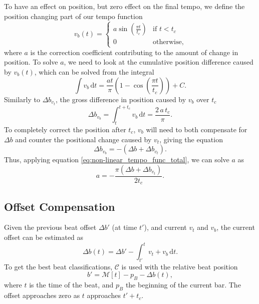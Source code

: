 To have an effect on position,
but zero effect on the final tempo,
we define the position changing part of our tempo function
\begin{equation}
v_b(t) =
\begin{cases}
a \sin \left( \frac{\pi t}{t_c} \right) & \text{if } t < t_c \\
0 & \text{otherwise},
\end{cases}
\end{equation}
where $a$ is the correction coefficient
contributing to the amount of change in position.
To solve $a$, we need to look at the
cumulative position difference caused by $v_b(t)$,
which can be solved from the integral
\begin{equation}
\int v_b \, \mathrm{d}t =
\frac{a t}{\pi} \left( 1 - \cos \left( \frac{\pi t}{t_c} \right) \right) + C.
\end{equation}
Similarly to $\Delta b_{v_t}$,
the gross difference in position caused by $v_b$ over $t_c$
\begin{equation}
\label{eq:non-linear_tempo_func_total}
\Delta b_{v_b} = \int_t^{t + t_c} v_b \, \mathrm{d}t =
\frac{2 \, a \, t_c}{\pi}.
\end{equation}
To completely correct the position after $t_c$,
$v_b$ will need to both compensate for
$\Delta b$ and counter the positional change caused by $v_t$,
giving the equation
\begin{equation}
\Delta b_{v_b} = - \left( \Delta b + \Delta b_{v_t} \right) .
\end{equation}
Thus, applying equation \ref{eq:non-linear_tempo_func_total},
we can solve $a$ as
\begin{equation}
\label{eq:non_linear_coef}
a = - \frac{\pi \left( \Delta b + \Delta b_{v_t} \right)}{2 t_c}.
\end{equation}

\subsection{Offset Compensation}

Given the previous beat offset $\Delta b'$ (at time $t'$),
and current $v_t$ and $v_b$,
the current offset can be estimated as
\begin{equation}
\label{eq:tempo_function_offset_function}
\Delta b(t) = \Delta b' - \int_{t'}^t v_t + v_b \, \mathrm{d}t.
\end{equation}
To get the best beat classifications,
$ \mathcal{C} $ is used with the relative beat position
\begin{equation}
b' = \mathcal{M} [ t ] - p_B - \Delta b(t),
\end{equation}
where $t$ is the time of the beat,
and $p_B$ the beginning of the current bar.
The offset approaches zero as $t$ approaches $t' + t_c$.

